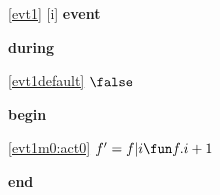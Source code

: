 \noindent \ref{evt1} [i] \textbf{event}
\begin{block}
\item \textbf{during}
\begin{block}
\item[ \eqref{evt1default} ]$\false $ %
\end{block}
\item \textbf{begin}
\begin{block}
\item[ \eqref{evt1m0:act0} ]$f' = f | i \fun f.i + 1 $ %
\end{block}
\item \textbf{end} \\
\end{block}
